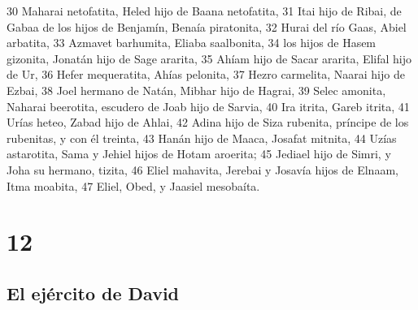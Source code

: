 30 Maharai netofatita, Heled hijo de Baana netofatita,
31 Itai hijo de Ribai, de Gabaa de los hijos de Benjamín, Benaía piratonita,
32 Hurai del río Gaas, Abiel arbatita,
33 Azmavet barhumita, Eliaba saalbonita,
34 los hijos de Hasem gizonita, Jonatán hijo de Sage ararita,
35 Ahíam hijo de Sacar ararita, Elifal hijo de Ur,
36 Hefer mequeratita, Ahías pelonita,
37 Hezro carmelita, Naarai hijo de Ezbai,
38 Joel hermano de Natán, Mibhar hijo de Hagrai,
39 Selec amonita, Naharai beerotita, escudero de Joab hijo de Sarvia,
40 Ira itrita, Gareb itrita,
41 Urías heteo, Zabad hijo de Ahlai,
42 Adina hijo de Siza rubenita, príncipe de los rubenitas, y con él treinta,
43 Hanán hijo de Maaca, Josafat mitnita,
44 Uzías astarotita, Sama y Jehiel hijos de Hotam aroerita;
45 Jediael hijo de Simri, y Joha su hermano, tizita,
46 Eliel mahavita, Jerebai y Josavía hijos de Elnaam, Itma moabita,
47 Eliel, Obed, y Jaasiel mesobaíta.

\chapter{12}

\section*{El ejército de David}



